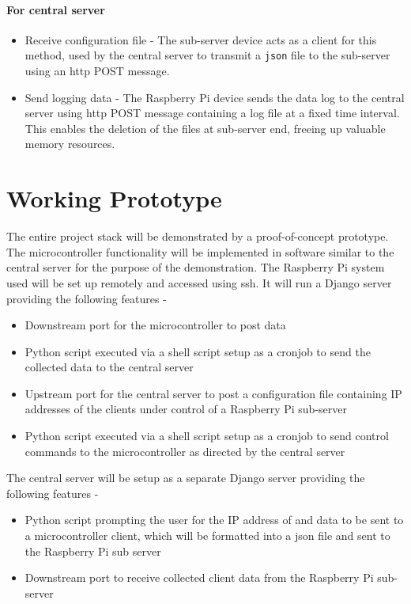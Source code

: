 \documentclass[letterpaper,11pt]{report}
\begin{document}
\subsubsection{For central server}
\begin{itemize}
    \item Receive configuration file - The sub-server device acts as a client for this method, used by the central server to transmit a \verb|json| file to the sub-server using an \ac{http} POST message.
    \item Send logging data - The Raspberry Pi device sends the data log to the central server using \ac{http} POST message containing a log file at a fixed time interval. This enables the deletion of the files at sub-server end, freeing up valuable memory resources.
\end{itemize}

\newpage
\chapter{Working Prototype}\label{chapter:workingprototype}
\onehalfspacing
The entire project stack will be demonstrated by a proof-of-concept prototype. The microcontroller functionality will be implemented in software similar to the central server for the purpose of the demonstration. The Raspberry Pi system used will be set up remotely and accessed using \ac{ssh}. It will run a Django server providing the following features -
\begin{itemize}
    \item Downstream port for the microcontroller to post data
    \item Python script executed via a shell script setup as a cronjob to send the collected data to the central server
    \item Upstream port for the central server to post a configuration file containing IP addresses of the clients under control of a Raspberry Pi sub-server
    \item Python script executed via a shell script setup as a cronjob to send control commands to the microcontroller as directed by the central server
\end{itemize}
The central server will be setup as a separate Django server providing the following features -
\begin{itemize}
    \item Python script prompting the user for the IP address of and data to be sent to a microcontroller client, which will be formatted into a \ac{json} file and sent to the Raspberry Pi sub server
    \item Downstream port to receive collected client data from the Raspberry Pi sub-server
\end{itemize}

\newpage
\nocite*{}


\end{document}
